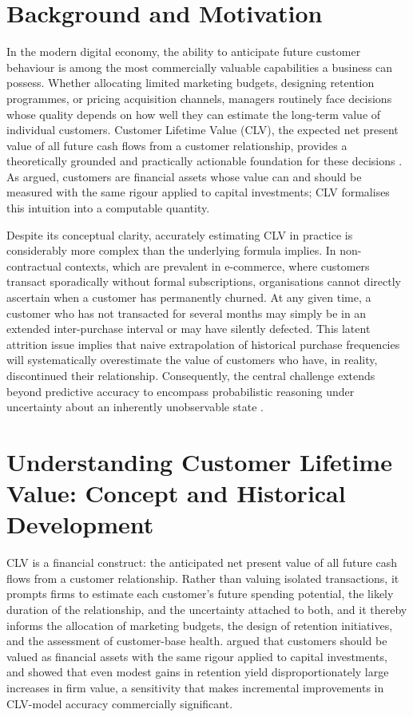\documentclass[12pt, a4paper, oneside]{report}
\begin{document}
\section{Background and Motivation}
\label{sec:motivation}

In the modern digital economy, the ability to anticipate future customer behaviour is among the most commercially valuable capabilities a business can possess. Whether allocating limited marketing budgets, designing retention programmes, or pricing acquisition channels, managers routinely face decisions whose quality depends on how well they can estimate the long-term value of individual customers. Customer Lifetime Value (CLV), the expected net present value of all future cash flows from a customer relationship, provides a theoretically grounded and practically actionable foundation for these decisions \parencite{gupta2006}. As \textcite{blattberg1996} argued, customers are financial assets whose value can and should be measured with the same rigour applied to capital investments; CLV formalises this intuition into a computable quantity.

Despite its conceptual clarity, accurately estimating CLV in practice is considerably more complex than the underlying formula implies. In non-contractual contexts, which are prevalent in e-commerce, where customers transact sporadically without formal subscriptions, organisations cannot directly ascertain when a customer has permanently churned. At any given time, a customer who has not transacted for several months may simply be in an extended inter-purchase interval or may have silently defected. This latent attrition issue implies that naive extrapolation of historical purchase frequencies will systematically overestimate the value of customers who have, in reality, discontinued their relationship. Consequently, the central challenge extends beyond predictive accuracy to encompass probabilistic reasoning under uncertainty about an inherently unobservable state \parencite{fader2009}.

\section{Understanding Customer Lifetime Value: Concept and Historical Development}
\label{sec:concept-history}

CLV is a financial construct: the anticipated net present value of all future cash flows from a customer relationship. Rather than valuing isolated transactions, it prompts firms to estimate each customer's future spending potential, the likely duration of the relationship, and the uncertainty attached to both, and it thereby informs the allocation of marketing budgets, the design of retention initiatives, and the assessment of customer-base health. \textcite{blattberg1996} argued that customers should be valued as financial assets with the same rigour applied to capital investments, and \textcite{gupta2006} showed that even modest gains in retention yield disproportionately large increases in firm value, a sensitivity that makes incremental improvements in CLV-model accuracy commercially significant.
\end{document}
